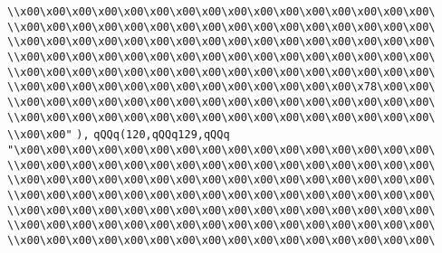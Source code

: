 \verb|\\x00\x00\x00\x00\x00\x00\x00\x00\x00\x00\x00\x00\x00\x00\x00\x00\|\newline
\verb|\\x00\x00\x00\x00\x00\x00\x00\x00\x00\x00\x00\x00\x00\x00\x00\x00\|\newline
\verb|\\x00\x00\x00\x00\x00\x00\x00\x00\x00\x00\x00\x00\x00\x00\x00\x00\|\newline
\verb|\\x00\x00\x00\x00\x00\x00\x00\x00\x00\x00\x00\x00\x00\x00\x00\x00\|\newline
\verb|\\x00\x00\x00\x00\x00\x00\x00\x00\x00\x00\x00\x00\x00\x00\x00\x00\|\newline
\verb|\\x00\x00\x00\x00\x00\x00\x00\x00\x00\x00\x00\x00\x00\x78\x00\x00\|\newline
\verb|\\x00\x00\x00\x00\x00\x00\x00\x00\x00\x00\x00\x00\x00\x00\x00\x00\|\newline
\verb|\\x00\x00\x00\x00\x00\x00\x00\x00\x00\x00\x00\x00\x00\x00\x00\x00\|\newline
\verb|\\x00\x00"|\newline
\verb|),|\newline
\verb|qQQq(120,qQQq129,qQQq|\newline
\verb|"\x00\x00\x00\x00\x00\x00\x00\x00\x00\x00\x00\x00\x00\x00\x00\x00\|\newline
\verb|\\x00\x00\x00\x00\x00\x00\x00\x00\x00\x00\x00\x00\x00\x00\x00\x00\|\newline
\verb|\\x00\x00\x00\x00\x00\x00\x00\x00\x00\x00\x00\x00\x00\x00\x00\x00\|\newline
\verb|\\x00\x00\x00\x00\x00\x00\x00\x00\x00\x00\x00\x00\x00\x00\x00\x00\|\newline
\verb|\\x00\x00\x00\x00\x00\x00\x00\x00\x00\x00\x00\x00\x00\x00\x00\x00\|\newline
\verb|\\x00\x00\x00\x00\x00\x00\x00\x00\x00\x00\x00\x00\x00\x00\x00\x00\|\newline
\verb|\\x00\x00\x00\x00\x00\x00\x00\x00\x00\x00\x00\x00\x00\x00\x00\x00\|\newline
